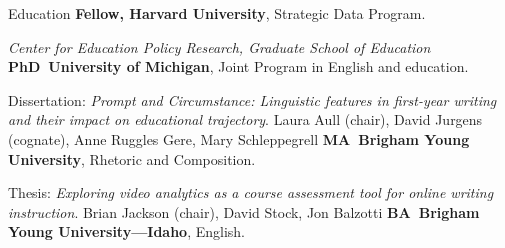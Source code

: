 \begin{rubric}{Education}
\entry*[2023 -- \dots]%
	\textbf{Fellow, Harvard University}, Strategic Data Program.
	\par\emph{Center for Education Policy Research, Graduate School of Education}
%
\entry*[2019 -- 2024]%
	\textbf{PhD~University of Michigan}, Joint Program in English and education.\par
	Dissertation: \emph{Prompt and Circumstance: Linguistic features in first-year writing and their impact on educational trajectory}. Laura Aull (chair), David Jurgens (cognate), Anne Ruggles Gere, Mary Schleppegrell 
% 
\entry*[2016 -- 2018]%
	\textbf{MA~Brigham Young University}, Rhetoric and Composition.\par
	Thesis: \emph{Exploring video analytics as a course assessment tool for online writing instruction}. Brian Jackson (chair), David Stock, Jon Balzotti
\entry*[2010 -- 2015]%
\textbf{BA~Brigham Young University---Idaho}, English.\par
\end{rubric}